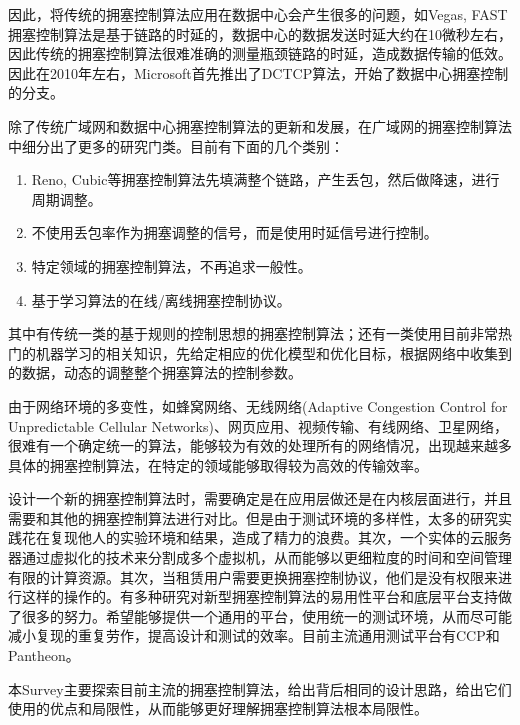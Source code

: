 \documentclass[a4paper, 12pt, UTF8]{ctexart}
\begin{document}
\par 因此，将传统的拥塞控制算法应用在数据中心会产生很多的问题，如Vegas, FAST拥塞控制算法是基于链路的时延的，数据中心的数据发送时延大约在10微秒左右，因此传统的拥塞控制算法很难准确的测量瓶颈链路的时延，造成数据传输的低效。因此在2010年左右，Microsoft首先推出了DCTCP\cite{DBLP:conf/sigcomm/AlizadehGMPPPSS10}算法，开始了数据中心拥塞控制的分支。

\par 除了传统广域网和数据中心拥塞控制算法的更新和发展，在广域网的拥塞控制算法中细分出了更多的研究门类。目前有下面的几个类别：
\begin{enumerate}
	\item Reno, Cubic等拥塞控制算法先填满整个链路，产生丢包，然后做降速，进行周期调整。
	\item 不使用丢包率作为拥塞调整的信号，而是使用时延信号进行控制。
	\item 特定领域的拥塞控制算法，不再追求一般性。
	\item 基于学习算法的在线/离线拥塞控制协议。
\end{enumerate}
\par 其中有传统一类的基于规则的控制思想的拥塞控制算法；还有一类使用目前非常热门的机器学习的相关知识，先给定相应的优化模型和优化目标，根据网络中收集到的数据，动态的调整整个拥塞算法的控制参数。

\par 由于网络环境的多变性，如蜂窝网络、无线网络(Adaptive Congestion Control for Unpredictable Cellular Networks)、网页应用、视频传输、有线网络、卫星网络，很难有一个确定统一的算法，能够较为有效的处理所有的网络情况，出现越来越多具体的拥塞控制算法，在特定的领域能够取得较为高效的传输效率。

\par 设计一个新的拥塞控制算法时，需要确定是在应用层做还是在内核层面进行，并且需要和其他的拥塞控制算法进行对比。但是由于测试环境的多样性，太多的研究实践花在复现他人的实验环境和结果，造成了精力的浪费。其次，一个实体的云服务器通过虚拟化的技术来分割成多个虚拟机，从而能够以更细粒度的时间和空间管理有限的计算资源。其次，当租赁用户需要更换拥塞控制协议，他们是没有权限\cite{DBLP:conf/sigcomm/HeRAGFCA16}来进行这样的操作的。有多种研究对新型拥塞控制算法的易用性平台和底层平台\cite{DBLP:conf/usenix/YanMHRWLW18}支持做了很多的努力。希望能够提供一个通用的平台，使用统一的测试环境，从而尽可能减小复现的重复劳作，提高设计和测试的效率。目前主流通用测试平台有CCP和Pantheon。

\par 本Survey主要探索目前主流的拥塞控制算法，给出背后相同的设计思路，给出它们使用的优点和局限性，从而能够更好理解拥塞控制算法根本局限性。
\end{document}
